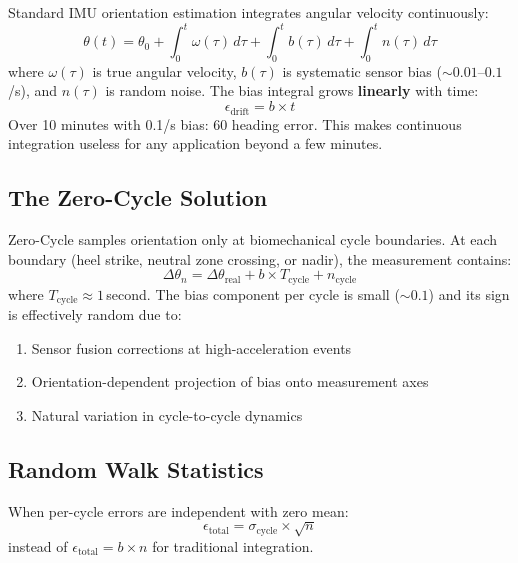 \documentclass[11pt,a4paper]{article}
\begin{document}
Standard IMU orientation estimation integrates angular velocity continuously:
\begin{equation}
\theta(t) = \theta_0 + \int_0^t \omega(\tau)\,d\tau + \int_0^t b(\tau)\,d\tau + \int_0^t n(\tau)\,d\tau
\end{equation}
where $\omega(\tau)$ is true angular velocity, $b(\tau)$ is systematic sensor
bias (${\sim}0.01$--$0.1$\textdegree/s), and $n(\tau)$ is random noise. The
bias integral grows \textbf{linearly} with time:
\begin{equation}
\epsilon_\text{drift} = b \times t
\end{equation}
Over 10 minutes with 0.1\textdegree/s bias: 60\textdegree{} heading error.
This makes continuous integration useless for any application beyond a few
minutes.

\subsection{The Zero-Cycle Solution}

Zero-Cycle samples orientation only at biomechanical cycle boundaries. At each
boundary (heel strike, neutral zone crossing, or nadir), the measurement
contains:
\begin{equation}
\Delta\theta_n = \Delta\theta_\text{real} + b \times T_\text{cycle} + n_\text{cycle}
\end{equation}
where $T_\text{cycle} \approx 1$\,second. The bias component per cycle is
small (${\sim}0.1$\textdegree) and its sign is effectively random due to:
\begin{enumerate}[nosep]
\item Sensor fusion corrections at high-acceleration events
\item Orientation-dependent projection of bias onto measurement axes
\item Natural variation in cycle-to-cycle dynamics
\end{enumerate}

\subsection{Random Walk Statistics}

When per-cycle errors are independent with zero mean:
\begin{equation}
\epsilon_\text{total} = \sigma_\text{cycle} \times \sqrt{n}
\label{eq:randomwalk}
\end{equation}
instead of $\epsilon_\text{total} = b \times n$ for traditional integration.
\end{document}
